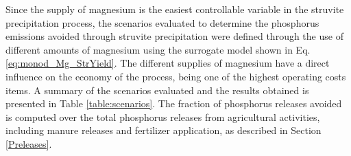 \begin{refsection}[referencesCh3]
Since the supply of magnesium is the easiest controllable variable in the struvite precipitation process, the scenarios evaluated to determine the phosphorus emissions avoided through struvite precipitation were defined through the use of different amounts of magnesium using the surrogate model shown in Eq. \ref{eq:monod_Mg_StrYield}. The different supplies of magnesium have a direct influence on the economy of the process, being one of the highest operating costs items. A summary of the scenarios evaluated and the results obtained is presented in Table \ref{table:scenarios}. The fraction of phosphorus releases avoided is computed over the total phosphorus releases from agricultural activities, including manure releases and fertilizer application, as described in Section \ref{Preleases}. 

\begin{table}[h]
	\centering
	\caption{Scenarios considered and results for cattle leachate phosphorus recovery} \label{table:scenarios}
\end{table}


\end{refsection}
